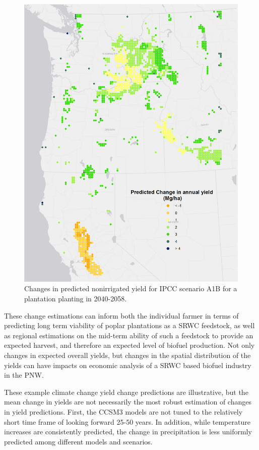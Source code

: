 \documentclass[preprint,12pt]{elsarticle}
\begin{document}
\begin{figure}[hp]
  \centering
  \includegraphics[width=1\linewidth]{climate_irrigated}
  \caption{Changes in predicted nonirrigated yield for \ac{IPCC} scenario A1B
    for a plantation planting in 2040-2058.}
  \label{fig:new_nonirrigated}
\end{figure}

These change estimations can inform both the individual farmer in terms of
predicting long term viability of poplar plantations as a \ac{SRWC}
feedstock, as well as regional estimations on the mid-term ability of
such a feedstock to provide an expected harvest, and therefore an
expected level of biofuel production.  Not only changes in expected
overall yields, but changes in the spatial distribution of the yields
can have impacts on economic analysis of a \ac{SRWC} based biofuel
industry in the \ac{PNW}.  

These example climate change yield change predictions are
illustrative, but the mean change in yields are not necessarily the
most robust estimation of changes in yield predictions.  First, the
\ac{CCSM3} models are not tuned to the relatively short time frame of
looking forward 25-50 years.  In addition, while temperature increases
are consistently predicted, the change in precipitation is less
uniformly predicted among different models and scenarios. 
\end{document}
